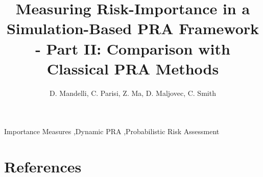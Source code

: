 \documentclass{elsarticle}
\begin{document}
\begin{frontmatter}

\title{Measuring Risk-Importance in a Simulation-Based PRA Framework - 
       Part II: Comparison with Classical PRA Methods}

\author{D. Mandelli, C. Parisi, Z. Ma, D. Maljovec, C. Smith}
\address{Idaho National Laboratory (INL), 2525 Fremont Ave, 83402 Idaho Falls (ID), USA}

\begin{abstract}
  
\end{abstract}

\begin{keyword}
Importance Measures \sep Dynamic PRA \sep Probabilistic Risk Assessment 
\end{keyword}

\end{frontmatter}

\linenumbers

\printnomenclature[1in]











\section*{References}


\end{document}
